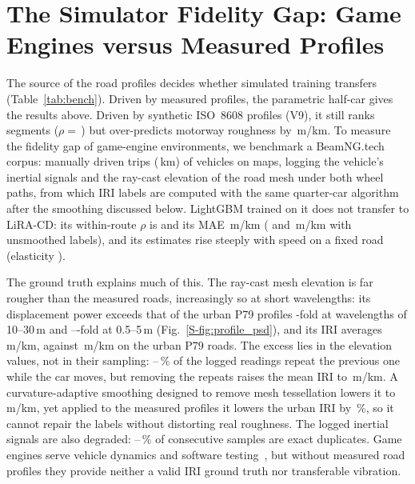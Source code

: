 \section{The Simulator Fidelity Gap: Game Engines versus Measured Profiles}
\label{sec:gameengine}
The source of the road profiles decides whether simulated training transfers (Table~\ref{tab:bench}).
Driven by measured profiles, the parametric half-car gives the results above.
Driven by synthetic ISO~8608 profiles (V9), it still ranks segments ($\rho=$\,\vvVnineRhoWithin) but over-predicts motorway roughness by \vvVnineBiasMotorway\,m/km.
To measure the fidelity gap of game-engine environments, we benchmark a BeamNG.tech~\cite{beamng} corpus: \geTrips{} manually driven trips (\geKm\,km) of \bngCars{} vehicles on \bngMaps{} maps, logging the vehicle's inertial signals and the ray-cast elevation of the road mesh under both wheel paths, from which IRI labels are computed with the same quarter-car algorithm after the smoothing discussed below.
LightGBM trained on it does not transfer to LiRA-CD: its within-route $\rho$ is \vvBcorrRhoWithin{} and its MAE \vvBcorrMaeWithin\,m/km (\vvBrawRhoWithin{} and \vvBrawMaeWithin\,m/km with unsmoothed labels), and its estimates rise steeply with speed on a fixed road (elasticity \vvBcorrElastPooled).

The ground truth explains much of this.
The ray-cast mesh elevation is far rougher than the measured roads, increasingly so at short wavelengths: its displacement power exceeds that of the urban P79 profiles \gePsdUrbanLong-fold at wavelengths of 10--30\,m and \gePsdUrbanShortMin--\gePsdUrbanShortMax-fold at 0.5--5\,m (Fig.~\ref{S-fig:profile_psd}), and its IRI averages \geIriLogged\,m/km, against \liraIriUrban\,m/km on the urban P79 roads.
The excess lies in the elevation values, not in their sampling: \geRepeatMin--\geRepeatMax\,\% of the logged readings repeat the previous one while the car moves, but removing the repeats raises the mean IRI to \geIriFresh\,m/km.
A curvature-adaptive smoothing designed to remove mesh tessellation lowers it to \geIriSmoothed\,m/km, yet applied to the measured profiles it lowers the urban IRI by \legacyCorrUrbanMape\,\%, so it cannot repair the labels without distorting real roughness.
The logged inertial signals are also degraded: \bngImuDupMin--\bngImuDupMax\,\% of consecutive samples are exact duplicates.
Game engines serve vehicle dynamics and software testing~\cite{gambi2019beamng}, but without measured road profiles they provide neither a valid IRI ground truth nor transferable vibration.
